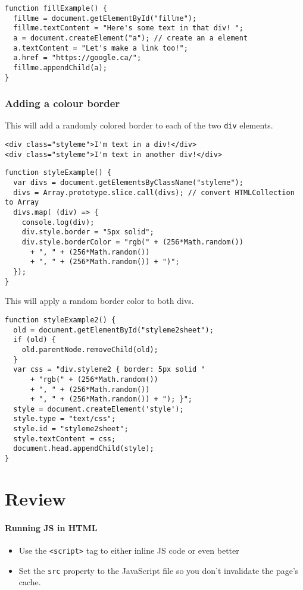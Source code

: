 \documentclass[../CMPUT-404-Notes.tex]{subfiles}
\begin{document}
\begin{verbatim}
function fillExample() {
  fillme = document.getElementById("fillme");
  fillme.textContent = "Here's some text in that div! ";
  a = document.createElement("a"); // create an a element
  a.textContent = "Let's make a link too!";
  a.href = "https://google.ca/";
  fillme.appendChild(a);
}
\end{verbatim}

\subsubsection{Adding a colour border}
This will add a randomly colored border to each of the two \texttt{div} elements.
\begin{verbatim}
<div class="styleme">I'm text in a div!</div>
<div class="styleme">I'm text in another div!</div>
\end{verbatim}

\begin{verbatim}
function styleExample() {
  var divs = document.getElementsByClassName("styleme");
  divs = Array.prototype.slice.call(divs); // convert HTMLCollection to Array
  divs.map( (div) => {
    console.log(div);
    div.style.border = "5px solid";
    div.style.borderColor = "rgb(" + (256*Math.random())
      + ", " + (256*Math.random())
      + ", " + (256*Math.random()) + ")";
  });
}
\end{verbatim}
This will apply a random border color to both divs. 
\begin{verbatim}
function styleExample2() {
  old = document.getElementById("styleme2sheet");
  if (old) {
    old.parentNode.removeChild(old);
  }
  var css = "div.styleme2 { border: 5px solid "
      + "rgb(" + (256*Math.random())
      + ", " + (256*Math.random())
      + ", " + (256*Math.random()) + "); }";
  style = document.createElement('style');
  style.type = "text/css";
  style.id = "styleme2sheet";
  style.textContent = css;
  document.head.appendChild(style);
}
\end{verbatim}

\section{Review}
\paragraph{Running JS in HTML}
\begin{itemize}
  \item Use the \texttt{<script>} tag to either inline JS code or even better 
  \item Set the \texttt{src} property to the JavaScript file so you don't invalidate the page's cache.
\end{itemize}
\end{document}
